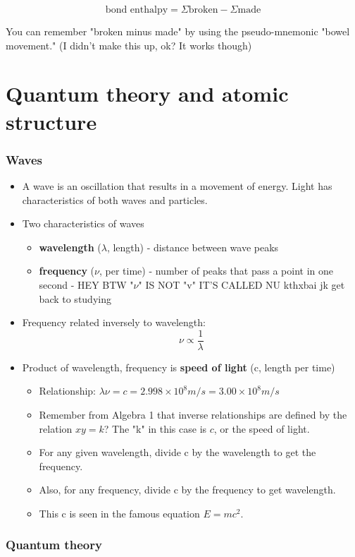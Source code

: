 \documentclass[letterpaper, 12pt]{article}
\begin{document}
$$\text{bond enthalpy} = \Sigma \text{broken} - \Sigma \text{made}$$

You can remember "broken minus made" by using the pseudo-mnemonic "bowel movement." (I didn't make this up, ok? It works though)

\clearpage
	
\part{Quantum theory and atomic structure}

\section{Waves}
	\begin{itemize}
		\item A wave is an oscillation that results in a movement of energy. Light has characteristics of both waves and particles.
		\item Two characteristics of waves
		\begin{itemize}
			\item \textbf{wavelength} ($\lambda$, length) - distance between wave peaks
			\item \textbf{frequency} ($\nu$, per time) - number of peaks that pass a point in one second - HEY BTW "$\nu$" IS NOT "v" IT'S CALLED NU kthxbai jk get back to studying
		\end{itemize}
		\item Frequency related inversely to wavelength: $$\nu \propto \frac{1}{\lambda}$$
		\item Product of wavelength, frequency is \textbf{speed of light} (c, length per time)
		\begin{itemize}
			\item Relationship: $\lambda \nu = c = 2.998 \times 10^8 m/s = 3.00 \times 10^8 m/s$
			\item Remember from Algebra 1 that inverse relationships are defined by the relation $xy = k$? The "k" in this case is $c$, or the speed of light.
			\item For any given wavelength, divide c by the wavelength to get the frequency.
			\item Also, for any frequency, divide c by the frequency to get wavelength.
			\item This c is seen in the famous equation $E = mc^2$.
		\end{itemize}
	\end{itemize}
\section{Quantum theory}
\end{document}
